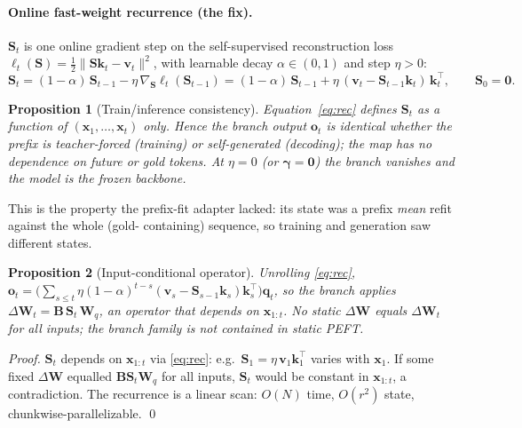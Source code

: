 \documentclass{article}       %
\newcommand{\x}{\bm{x}}\newcommand{\q}{\bm{q}}\newcommand{\bk}{\bm{k}}\newcommand{\vv}{\bm{v}}
\newcommand{\W}{\bm{W}}\newcommand{\B}{\bm{B}}\newcommand{\SM}{\bm{S}}
\newtheorem{proposition}{Proposition}
\begin{document}
\paragraph{Online fast-weight recurrence (the fix).} $\SM_t$ is one online gradient step on the self-supervised
reconstruction loss $\ell_t(\SM)=\tfrac12\|\SM\bk_t-\vv_t\|^2$, with learnable decay $\alpha\in(0,1)$ and step $\eta>0$:
\begin{equation}
\SM_t=(1-\alpha)\,\SM_{t-1}-\eta\,\nabla_{\SM}\ell_t(\SM_{t-1})
     =(1-\alpha)\,\SM_{t-1}+\eta\,(\vv_t-\SM_{t-1}\bk_t)\,\bk_t^{\top},\qquad \SM_0=\bm 0.
\label{eq:rec}
\end{equation}
\begin{proposition}[Train/inference consistency]\label{prop:consist}
Equation~\eqref{eq:rec} defines $\SM_t$ as a function of $(\x_1,\dots,\x_t)$ only. Hence the branch output $\bm o_t$ is
identical whether the prefix is teacher-forced (training) or self-generated (decoding); the map has no dependence on future
or gold tokens. At $\eta=0$ (or $\bm\gamma=\bm0$) the branch vanishes and the model is the frozen backbone.
\end{proposition}
This is the property the prefix-fit adapter lacked: its state was a prefix \emph{mean} refit against the whole (gold-
containing) sequence, so training and generation saw different states.
\begin{proposition}[Input-conditional operator]\label{prop:cond}
Unrolling \eqref{eq:rec}, $\bm o_t=\big(\sum_{s\le t}\eta(1-\alpha)^{t-s}(\vv_s-\SM_{s-1}\bk_s)\bk_s^{\top}\big)\q_t$, so
the branch applies $\Delta\W_t=\B\,\SM_t\,\W_q$, an operator that depends on $\x_{1:t}$. No static $\Delta\W$ equals
$\Delta\W_t$ for all inputs; the branch family is not contained in static PEFT.
\end{proposition}
\begin{proof}
$\SM_t$ depends on $\x_{1:t}$ via \eqref{eq:rec}: e.g.\ $\SM_1=\eta\,\vv_1\bk_1^{\top}$ varies with $\x_1$. If some fixed
$\Delta\W$ equalled $\B\SM_t\W_q$ for all inputs, $\SM_t$ would be constant in $\x_{1:t}$, a contradiction. The recurrence
is a linear scan: $O(N)$ time, $O(r^2)$ state, chunkwise-parallelizable. \qed
\end{proof}
\end{document}
